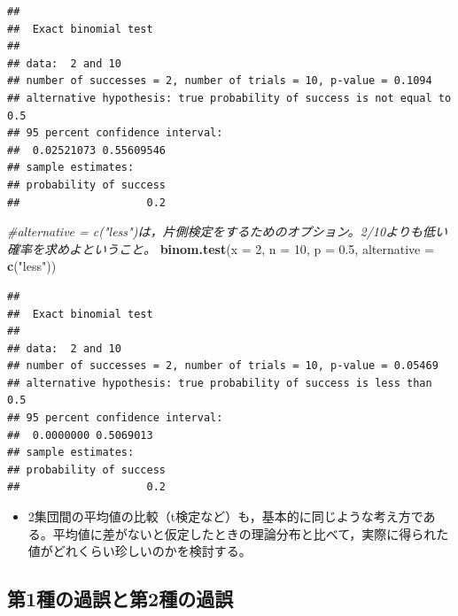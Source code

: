 \documentclass[]{article}
\newenvironment{Shaded}{\begin{snugshade}}{\end{snugshade}}
\newcommand{\KeywordTok}[1]{\textcolor[rgb]{0.13,0.29,0.53}{\textbf{#1}}}
\newcommand{\DataTypeTok}[1]{\textcolor[rgb]{0.13,0.29,0.53}{#1}}
\newcommand{\DecValTok}[1]{\textcolor[rgb]{0.00,0.00,0.81}{#1}}
\newcommand{\FloatTok}[1]{\textcolor[rgb]{0.00,0.00,0.81}{#1}}
\newcommand{\StringTok}[1]{\textcolor[rgb]{0.31,0.60,0.02}{#1}}
\newcommand{\CommentTok}[1]{\textcolor[rgb]{0.56,0.35,0.01}{\textit{#1}}}
\newcommand{\NormalTok}[1]{#1}
\providecommand{\tightlist}{%
  \setlength{\itemsep}{0pt}\setlength{\parskip}{0pt}}
\begin{document}
\begin{verbatim}
## 
##  Exact binomial test
## 
## data:  2 and 10
## number of successes = 2, number of trials = 10, p-value = 0.1094
## alternative hypothesis: true probability of success is not equal to 0.5
## 95 percent confidence interval:
##  0.02521073 0.55609546
## sample estimates:
## probability of success 
##                    0.2
\end{verbatim}

\begin{Shaded}
\begin{Highlighting}[]
\CommentTok{#alternative = c("less")は，片側検定をするためのオプション。2/10よりも低い確率を求めよということ。}
\KeywordTok{binom.test}\NormalTok{(}\DataTypeTok{x =} \DecValTok{2}\NormalTok{, }\DataTypeTok{n =} \DecValTok{10}\NormalTok{, }\DataTypeTok{p =} \FloatTok{0.5}\NormalTok{, }\DataTypeTok{alternative =} \KeywordTok{c}\NormalTok{(}\StringTok{"less"}\NormalTok{))}
\end{Highlighting}
\end{Shaded}

\begin{verbatim}
## 
##  Exact binomial test
## 
## data:  2 and 10
## number of successes = 2, number of trials = 10, p-value = 0.05469
## alternative hypothesis: true probability of success is less than 0.5
## 95 percent confidence interval:
##  0.0000000 0.5069013
## sample estimates:
## probability of success 
##                    0.2
\end{verbatim}

\begin{itemize}
\tightlist
\item
  2集団間の平均値の比較（t検定など）も，基本的に同じような考え方である。平均値に差がないと仮定したときの理論分布と比べて，実際に得られた値がどれくらい珍しいのかを検討する。
\end{itemize}

\subsection{第1種の過誤と第2種の過誤}\label{12}
\end{document}
